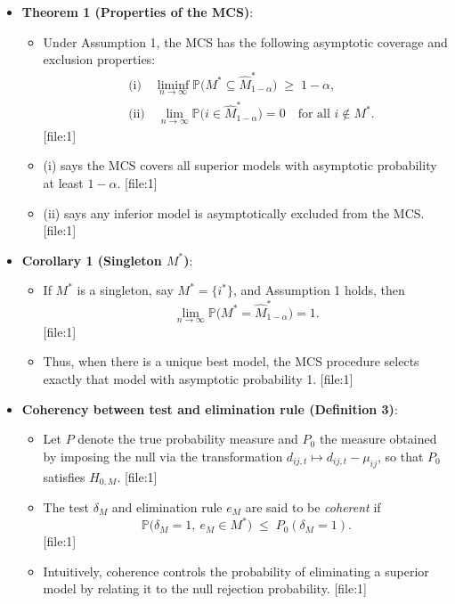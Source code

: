 \begin{itemize}

  \item \textbf{Theorem 1 (Properties of the MCS)}:
    \begin{itemize}
      \item Under Assumption 1, the MCS has the following asymptotic coverage and exclusion properties:
        \begin{align*}
          &\text{(i)} \quad \liminf_{n\to\infty} \mathbb{P}\bigl( M^\ast \subseteq \widehat{M}^\ast_{1-\alpha} \bigr) \;\ge\; 1 - \alpha, \\[0.4em]
          &\text{(ii)} \quad \lim_{n\to\infty} \mathbb{P}\bigl( i \in \widehat{M}^\ast_{1-\alpha} \bigr) = 0 \quad \text{for all } i \notin M^\ast.
        \end{align*} [file:1]
      \item (i) says the MCS covers all superior models with asymptotic probability at least $1-\alpha$. [file:1]
      \item (ii) says any inferior model is asymptotically excluded from the MCS. [file:1]
    \end{itemize}


  \item \textbf{Corollary 1 (Singleton $M^\ast$)}:
    \begin{itemize}
      \item If $M^\ast$ is a singleton, say $M^\ast = \{i^\ast\}$, and Assumption 1 holds, then
        \[
          \lim_{n\to\infty} \mathbb{P}\bigl( M^\ast = \widehat{M}^\ast_{1-\alpha} \bigr) = 1.
        \] [file:1]
      \item Thus, when there is a unique best model, the MCS procedure selects exactly that model with asymptotic probability 1. [file:1]
    \end{itemize}


  \item \textbf{Coherency between test and elimination rule (Definition 3)}:
    \begin{itemize}
      \item Let $P$ denote the true probability measure and $P_0$ the measure obtained by imposing the null via the transformation $d_{ij,t} \mapsto d_{ij,t} - \mu_{ij}$, so that $P_0$ satisfies $H_{0,M}$. [file:1]
      \item The test $\delta_M$ and elimination rule $e_M$ are said to be \emph{coherent} if
        \[
          \mathbb{P}\bigl( \delta_M = 1,\ e_M \in M^\ast \bigr) \;\le\; P_0(\delta_M = 1).
        \] [file:1]
      \item Intuitively, coherence controls the probability of eliminating a superior model by relating it to the null rejection probability. [file:1]
    \end{itemize}


\end{itemize}
